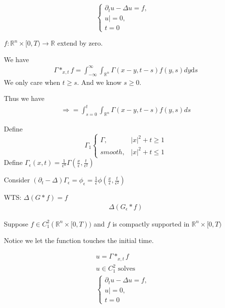 \documentclass[11pt]{article}
\begin{document}
\begin{equation}
    \begin{cases} 
    \partial_{t}u - \Delta u = f, &  \\ 
    u| = 0, &   \\
    t = 0
    \end{cases}
\end{equation}

$f: \mathbb{R}^{n} \times [0,T) \to \mathbb{R}$ extend by zero.

We have 
\begin{align*}
    \Gamma \ast_{x,t}f = \int_{-\infty}^{\infty}\int_{\mathbb{R}^{n}}\Gamma(x-y,t-s)
    f(y,s)  dy \mathrm{d}s
\end{align*}
We only care when $t \ge s$. And we know $s \ge 0$.

Thus we have 
\begin{align*}
    \Longrightarrow = \int_{s=0}^{t}\int_{\mathbb{R}^{n}}\Gamma(x-y, t-s)f(y,s)ds
\end{align*}

Define 
\begin{equation}
    \Gamma_{1}
    \begin{cases} 
    \Gamma, &|x|^{2} + t  \ge 1 \\ 
    smooth, &|x|^{2} + t \le 1    
    \end{cases}
\end{equation}
Define $\Gamma_{\epsilon}(x,t) = \frac{1}{\epsilon^{n}}
\Gamma(\frac{x}{\epsilon}, \frac{t}{\epsilon^{2}})$

Consider $(\partial_{t} -\Delta)\Gamma_{\epsilon} = \phi_{\epsilon} = \frac{1}{\epsilon}
\phi(\frac{x}{\epsilon}, \frac{t}{\epsilon^{2}})$


WTS: $\Delta(G \ast f) = f$
\begin{align*}
    \Delta(G_{\epsilon} \ast f)
\end{align*}

\begin{proposition}
    Suppose $f \in C^{2}_{1}(\mathbb{R}^{n} \times [0,T))$ and $f$ is compactly supported in 
    $\mathbb{R}^{n} \times [0,T)$
\end{proposition}
\begin{remark}
    Notice we let the function touches the initial time.
\end{remark}


\begin{equation}
    \begin{aligned}
        u = \Gamma \ast_{x,t}f \\
        u \in C_{1}^{2}\text{ solves}\\
        \begin{cases} 
        \partial_{t}u - \Delta u = f, &  \\ 
        u| = 0, &   \\
        t = 0
        \end{cases}
    \end{aligned}
\end{equation}
\end{document}
